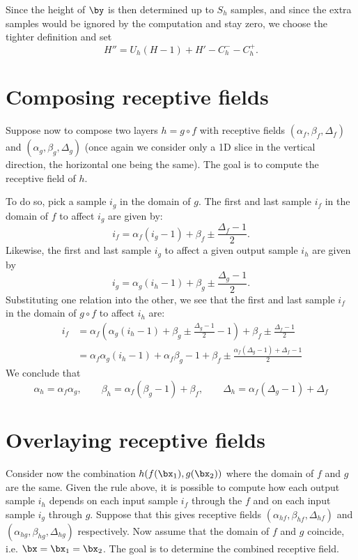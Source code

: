 Since the height of $\by$ is then determined up to $S_h$ samples, and since the extra samples would be ignored by the computation and stay zero, we choose the tighter definition and set
\[
H'' =  U_h (H-1) +H' -  C_h^- - C_h^+.
\]

\section{Composing receptive fields}\label{s:receptive-composing}

Suppose now to compose two layers $h = g \circ f$ with receptive fields $(\alpha_f, \beta_f, \Delta_f)$ and $(\alpha_g, \beta_g, \Delta_g)$ (once again we consider only a 1D slice in the vertical direction, the horizontal one being the same). The goal is to compute the receptive field of $h$.

To do so, pick a sample $i_g$ in the domain of $g$. The first and last sample $i_f$ in the domain of $f$ to affect $i_g$ are given by:
\[
  i_f = \alpha_f (i_g- 1) + \beta_f \pm \frac{\Delta_f - 1}{2}.
\]
Likewise, the first and last sample $i_g$ to affect a given output sample $i_h$ are given by
\[
  i_g = \alpha_g (i_h- 1) + \beta_g \pm \frac{\Delta_g - 1}{2}.
\]
Substituting one relation into the other, we see that the first and last sample $i_f$ in the domain of $g \circ f$ to affect $i_h$ are:
\begin{align*}\
 i_f &= \alpha_f \left(\alpha_g (i_h- 1) + \beta_g \pm \frac{\Delta_g - 1}{2} - 1\right) + \beta_f \pm \frac{\Delta_f - 1}{2}	
 \\
&= \alpha_f\alpha_g (i_h-1)
 + \alpha_f \beta_g - 1 + \beta_f
 \pm \frac{\alpha_f (\Delta_g - 1) + \Delta_f -1}{2}
\end{align*}
We conclude that
\[
\alpha_h = \alpha_f \alpha_g,
\qquad
\beta_h =  \alpha_f (\beta_g - 1) + \beta_f,
\qquad
\Delta_h = \alpha_f (\Delta_g - 1) + \Delta_f
\]

\section{Overlaying receptive fields}\label{s:receptive-overlying}

Consider now the combination $h(f(\bx_1), g(\bx_2))$ where the domain of $f$ and $g$ are the same. Given the rule above, it is possible to compute how each output sample $i_h$ depends on each input sample $i_f$ through the $f$ and on each input sample $i_g$ through $g$. Suppose that this gives receptive fields $(\alpha_{hf}, \beta_{hf}, \Delta_{hf})$ and $(\alpha_{hg}, \beta_{hg}, \Delta_{hg})$ respectively. Now assume that the domain of $f$ and $g$ coincide, i.e. $\bx = \bx_1 = \bx_2$. The goal is to determine the combined receptive field.

